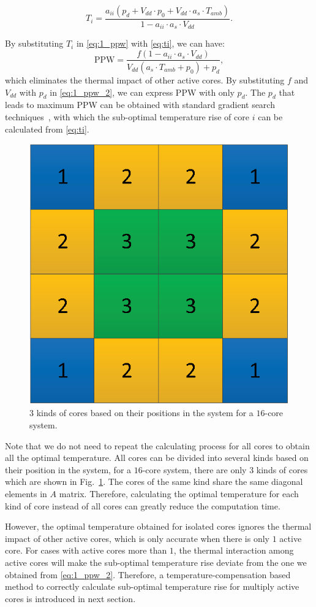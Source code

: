 \begin{equation}\label{eq:ti}
T_{i}=\frac{a_{ii}(p_{d}+V_{dd}\cdot p_{0}+V_{dd}\cdot a_{s}\cdot T_{amb})}{1-a_{ii} \cdot a_{s} \cdot V_{dd}}.
\end{equation}

By substituting $T_{i}$ in \eqref{eq:1_ppw} with \eqref{eq:ti}, we can have:
\begin{equation}\label{eq:1_ppw_2}
\text{PPW} = \frac{f(1-a_{ii} \cdot a_{s} \cdot V_{dd})}{V_{dd}(a_{s}\cdot T_{amb}+p_{0})+p_{d}},
\end{equation}
which eliminates the thermal impact of other active cores. By substituting $f$ and $V_{dd}$ with $p_{d}$ in \eqref{eq:1_ppw_2}, we can express PPW with only $p_{d}$. The $p_{d}$ that leads to maximum PPW can be obtained with standard gradient search techniques~\cite{Boyd:Convex_BOOK'06}, with which the sub-optimal temperature rise of core $i$ can be calculated from \eqref{eq:ti}.

\begin{figure}
\centering
\includegraphics[width=0.46\linewidth]{fig/unique_position.eps}
\caption{$3$ kinds of cores based on their positions in the system for a $16$-core system.}
\label{fig:unique_position}
\end{figure}

Note that we do not need to repeat the calculating process for all cores to obtain all the optimal temperature. All cores can be divided into several kinds based on their position in the system, for a $16$-core system, there are only $3$ kinds of cores which are shown in Fig.~\ref{fig:unique_position}. The cores of the same kind share the same diagonal elements in $A$ matrix. Therefore, calculating the optimal temperature for each kind of core instead of all cores can greatly reduce the computation time.

However, the optimal temperature obtained for isolated cores ignores the thermal impact of other active cores, which is only accurate when there is only $1$ active core. For cases with active cores more than $1$, the thermal interaction among active cores will make the sub-optimal temperature rise deviate from the one we obtained from \eqref{eq:1_ppw_2}. Therefore, a temperature-compensation based method to correctly calculate sub-optimal temperature rise for multiply active cores is introduced in next section.

